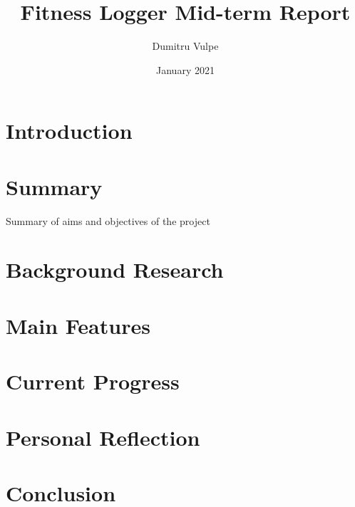 \documentclass[11pt]{article}
\title{Fitness Logger Mid-term Report}
\author{Dumitru Vulpe}
\date{January 2021}
\begin{document}
\maketitle
\tableofcontents
\newpage

\section{Introduction}

\section{Summary}
Summary of aims and objectives of the project

\section{Background Research}

\section{Main Features}

\section{Current Progress}


\section{Personal Reflection}

\section{Conclusion}
\end{document}
